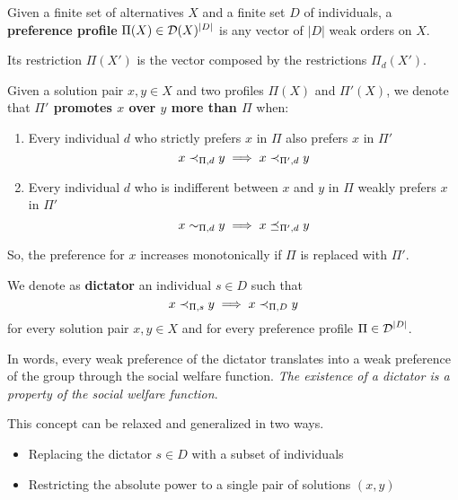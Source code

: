 \begin{definition}
	Given a finite set of alternatives $X$ and a finite set $D$ of individuals, a \textbf{preference profile} $\Pi (X) \in \operatorname{\mathcal{D}}(X)^{|D|}$ is any vector of $|D|$ weak orders on $X$.
\end{definition}

Its restriction $\Pi (X')$ is the vector composed by the restrictions $\Pi_d (X')$. \\

\begin{definition}
	Given a solution pair $x, y \in X$ and two profiles $\Pi (X)$ and $\Pi'(X)$, we denote that \textbf{$\Pi'$ promotes $x$ over $y$ more than $\Pi$} when:
	\begin{enumerate}
		\item Every individual $d$ who strictly prefers $x$ in $\Pi$ also prefers $x$ in $\Pi'$ 
		$$ x \prec_{\Pi, d} y \implies x \prec_{\Pi', d} y $$
		
		\item Every individual $d$ who is indifferent between $x$ and $y$ in $\Pi$ weakly prefers $x$ in $\Pi'$
		$$ x \sim_{\Pi, d} y \implies x \preceq_{\Pi', d} y $$
	\end{enumerate}
\end{definition}
So, the preference for $x$ increases monotonically if $\Pi$ is replaced with $\Pi'$. \\

\begin{definition}
	We denote as \textbf{dictator} an individual $s \in D$ such that
	$$ x \prec_{\Pi, s} y \implies x \prec_{\Pi, D} y $$
	for every solution pair $x, y \in X$ and for every preference profile $\Pi \in \operatorname{\mathcal{D}}^{|D|}$.
\end{definition}

In words, every weak preference of the dictator translates into a weak preference of the group through the social welfare function. \textit{The existence of a dictator is a property of the social welfare function}.

This concept can be relaxed and generalized in two ways. 
\begin{itemize}
	\item Replacing the dictator $s \in D$ with a subset of individuals
	
	\item Restricting the absolute power to a single pair of solutions $(x, y)$ \\
\end{itemize}

